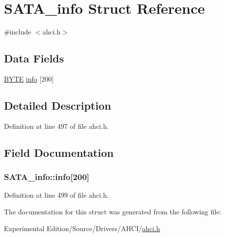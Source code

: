 \hypertarget{structSATA__info}{}\section{S\+A\+T\+A\+\_\+info Struct Reference}
\label{structSATA__info}


{\ttfamily \#include $<$ahci.\+h$>$}

\subsection*{Data Fields}
\begin{DoxyCompactItemize}
\item 
\hyperlink{ahci_8h_aae9749d96e15ccb4f482dd5f55d98f9b}{B\+Y\+TE} \hyperlink{structSATA__info_a9207c2886b1c2e952ef6c1f9fc0dd13b}{info} \mbox{[}200\mbox{]}
\end{DoxyCompactItemize}


\subsection{Detailed Description}


Definition at line 497 of file ahci.\+h.



\subsection{Field Documentation}
\subsubsection[{\texorpdfstring{info}{info}}]{ S\+A\+T\+A\+\_\+info\+::info\mbox{[}200\mbox{]}}\hypertarget{structSATA__info_a9207c2886b1c2e952ef6c1f9fc0dd13b}{}\label{structSATA__info_a9207c2886b1c2e952ef6c1f9fc0dd13b}


Definition at line 499 of file ahci.\+h.



The documentation for this struct was generated from the following file\+:\begin{DoxyCompactItemize}
\item 
Experimental Edition/\+Source/\+Drivers/\+A\+H\+C\+I/\hyperlink{ahci_8h}{ahci.\+h}\end{DoxyCompactItemize}
